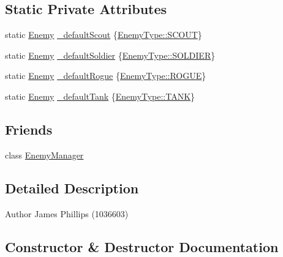 \subsection*{Static Private Attributes}
\begin{DoxyCompactItemize}
\item 
static \hyperlink{class_enemy}{Enemy} \hyperlink{class_enemy_a2fc8a9f17adf285b5e4de6313634be22}{\+\_\+default\+Scout} \{\hyperlink{_enemy_8h_ac3e413a86119db4b031458c7259e268eaa171194925053f44024a82de9d20148a}{Enemy\+Type\+::\+S\+C\+O\+UT}\}
\item 
static \hyperlink{class_enemy}{Enemy} \hyperlink{class_enemy_ab8db9b04d15ed20f32c541b6a3fccecc}{\+\_\+default\+Soldier} \{\hyperlink{_enemy_8h_ac3e413a86119db4b031458c7259e268ea36101183b0be7bffbbe6d24ef81987a1}{Enemy\+Type\+::\+S\+O\+L\+D\+I\+ER}\}
\item 
static \hyperlink{class_enemy}{Enemy} \hyperlink{class_enemy_a678760b166085ad28d2568c80dde9c70}{\+\_\+default\+Rogue} \{\hyperlink{_enemy_8h_ac3e413a86119db4b031458c7259e268ea416f104f4dfca42fccfd1d6e7534d3ad}{Enemy\+Type\+::\+R\+O\+G\+UE}\}
\item 
static \hyperlink{class_enemy}{Enemy} \hyperlink{class_enemy_a27c1284d98b8009247f0a1347811876f}{\+\_\+default\+Tank} \{\hyperlink{_enemy_8h_ac3e413a86119db4b031458c7259e268eafce7f36275b432d29255606c0f395dcd}{Enemy\+Type\+::\+T\+A\+NK}\}
\end{DoxyCompactItemize}
\subsection*{Friends}
\begin{DoxyCompactItemize}
\item 
class \hyperlink{class_enemy_a316703164b8c295e193f235a3c275003}{Enemy\+Manager}
\end{DoxyCompactItemize}


\subsection{Detailed Description}
\begin{DoxyAuthor}{Author}
James Phillips (1036603) 
\end{DoxyAuthor}


\subsection{Constructor \& Destructor Documentation}
\mbox{\label{class_enemy_aad76aec6e71a26cff30fd4bb1d5323d2}} 
